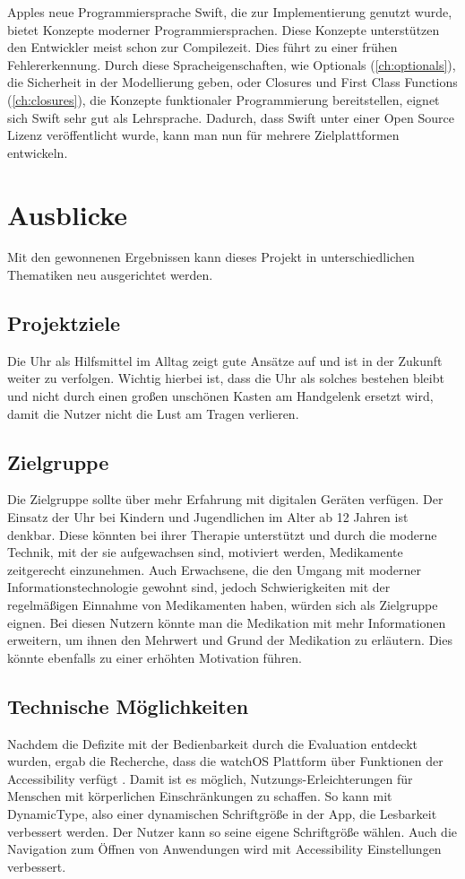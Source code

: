 Apples neue Programmiersprache Swift, die zur Implementierung genutzt wurde, bietet Konzepte moderner Programmiersprachen. Diese Konzepte unterstützen den Entwickler meist schon zur Compilezeit. Dies führt zu einer frühen Fehlererkennung. Durch diese Spracheigenschaften, wie Optionals (\ref{ch:optionals}), die Sicherheit in der Modellierung geben, oder Closures und First Class Functions (\ref{ch:closures}), die Konzepte funktionaler Programmierung bereitstellen, eignet sich Swift sehr gut als Lehrsprache. Dadurch, dass Swift unter einer Open Source Lizenz veröffentlicht wurde, kann man nun für mehrere Zielplattformen entwickeln.

\section{Ausblicke}
Mit den gewonnenen Ergebnissen kann dieses Projekt in unterschiedlichen Thematiken neu ausgerichtet werden. 
\subsection*{Projektziele}
Die Uhr als Hilfsmittel im Alltag zeigt gute Ansätze auf und ist in der Zukunft weiter zu verfolgen. Wichtig hierbei ist, dass die Uhr als solches bestehen bleibt und nicht durch einen großen unschönen Kasten am Handgelenk ersetzt wird, damit die Nutzer nicht die Lust am Tragen verlieren.

\subsection*{Zielgruppe}
Die Zielgruppe sollte über mehr Erfahrung mit digitalen Geräten verfügen. Der Einsatz der Uhr bei Kindern und Jugendlichen im Alter ab 12 Jahren ist denkbar. Diese könnten bei ihrer Therapie unterstützt und durch die moderne Technik, mit der sie aufgewachsen sind, motiviert werden, Medikamente zeitgerecht einzunehmen. Auch Erwachsene, die den Umgang mit moderner Informationstechnologie gewohnt sind, jedoch Schwierigkeiten mit der regelmäßigen Einnahme von Medikamenten haben, würden sich als Zielgruppe eignen. Bei diesen Nutzern könnte man die Medikation mit mehr Informationen erweitern, um ihnen den Mehrwert und Grund der Medikation zu erläutern. Dies könnte ebenfalls zu einer erhöhten Motivation führen.

\subsection*{Technische Möglichkeiten}
Nachdem die Defizite mit der Bedienbarkeit durch die Evaluation entdeckt wurden, ergab die Recherche, dass die watchOS Plattform über Funktionen der Accessibility verfügt \cite{Apple:watchAccess}. Damit ist es möglich, Nutzungs-Erleichterungen für Menschen mit körperlichen Einschränkungen zu schaffen. So kann mit DynamicType, also einer dynamischen Schriftgröße in der App, die Lesbarkeit verbessert werden. Der Nutzer kann so seine eigene Schriftgröße wählen. Auch die Navigation zum Öffnen von Anwendungen wird mit Accessibility Einstellungen verbessert.

